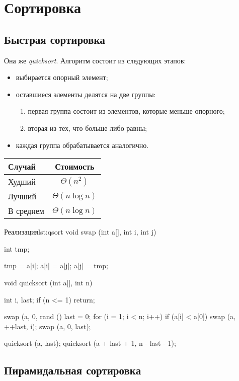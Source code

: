 \section{Сортировка}
\label{sec:sorting}

\subsection{Быстрая сортировка}

Она же \emph{quicksort}. Алгоритм состоит из следующих этапов:
\begin{itemize}
  \item выбирается опорный элемент;
  \item оставшиеся элементы делятся на две группы:
    \begin{enumerate}
      \item первая группа состоит из элементов, которые меньше опорного;
      \item вторая из тех, что больше либо равны;
    \end{enumerate}
  \item каждая группа обрабатывается аналогично.
\end{itemize}

\begin{center}
  \begin{tabular}{lc}
    \toprule
    Случай & Стоимость \\
    \midrule
    Худший & $\Theta(n^2)$ \\
    Лучший & $\Theta(n \log n)$ \\
    В среднем & $\Theta(n \log n)$ \\
    \bottomrule
  \end{tabular}
\end{center}

\begin{clst}{Реализация}{lst:qsort}
void swap (int a[], int i, int j) {
  int tmp;

  tmp = a[i];
  a[i] = a[j];
  a[j] = tmp;
}

void quicksort (int a[], int n) {
  int i, last;
  if (n <= 1)
    return;

  swap (a, 0, rand () %
  last = 0;
  for (i = 1; i < n; i++)
    if (a[i] < a[0])
      swap (a, ++last, i);
  swap (a, 0, last);

  quicksort (a, last);
  quicksort (a + last + 1, n - last - 1);
}
\end{clst}

\subsection{Пирамидальная сортировка}

